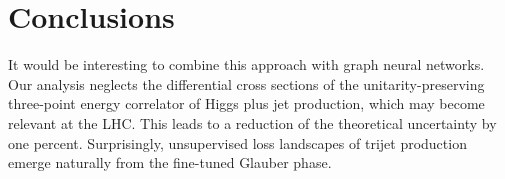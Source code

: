\section{Conclusions}\label{sec:conclusions}

It would be interesting to combine this approach with graph neural
networks. Our analysis neglects the differential cross sections of the
unitarity-preserving three-point energy correlator of Higgs plus jet
production, which may become relevant at the LHC. This leads to a
reduction of the theoretical uncertainty by one percent. Surprisingly,
unsupervised loss landscapes of trijet production emerge naturally from
the fine-tuned Glauber phase.

